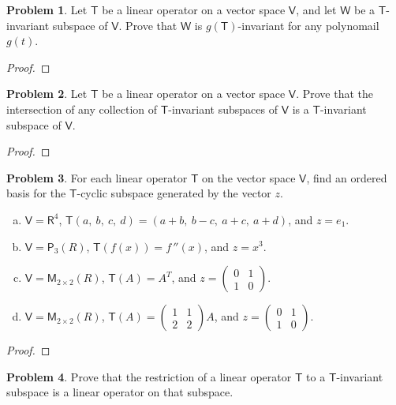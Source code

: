 \documentclass[12pt]{book}
\theoremstyle{definition}
\newtheorem{problem}{Problem}
\begin{document}
	\newpage
	\begin{problem}
		Let $\mathsf{T}$ be a linear operator on a vector space $\mathsf{V}$, and let $\mathsf{W}$ be a $\mathsf{T}$-invariant subspace of $\mathsf{V}$. Prove that $\mathsf{W}$ is $g(\mathsf{T})$-invariant for any polynomail $g(t)$.
	\end{problem}
	\begin{proof}
	\end{proof}
	\newpage
	\begin{problem}
		Let $\mathsf{T}$ be a linear operator on a vector space $\mathsf{V}$. Prove that the intersection of any collection of $\mathsf{T}$-invariant subspaces of $\mathsf{V}$ is a $\mathsf{T}$-invariant subspace of $\mathsf{V}$.
	\end{problem}
	\begin{proof}
	\end{proof}
	\newpage
	\begin{problem}
		For each linear operator $\mathsf{T}$ on the vector space $\mathsf{V}$, find an ordered basis for the $\mathsf{T}$-cyclic subspace generated by the vector $z$.
		\begin{enumerate}[(a)]
			\item $\mathsf{V}=\mathsf{R}^4$, $\mathsf{T}(a,~b,~c,~d)=(a+b,~b-c,~a+c,~a+d)$, and $z=e_1$.
			\item $\mathsf{V}=\mathsf{P}_3(R)$, $\mathsf{T}(f(x))=f\,''(x)$, and $z=x^3$.
			\item $\mathsf{V}=\mathsf{M}_{2\times 2}(R)$, $\mathsf{T}(A)=A^T$, and $z=\begin{pmatrix}
				0&1\\1&0
			\end{pmatrix}$.
			\item $\mathsf{V}=\mathsf{M}_{2\times 2}(R)$, $\mathsf{T}(A)=\begin{pmatrix}
				1&1\\2&2
			\end{pmatrix}A$, and $z=\begin{pmatrix}
			0&1\\1&0
		\end{pmatrix}$.
		\end{enumerate}
	\end{problem}
	\begin{proof}
	\end{proof}
	\newpage
	\begin{problem}
		Prove that the restriction of a linear operator $\mathsf{T}$ to a $\mathsf{T}$-invariant subspace is a linear operator on that subspace.
	\end{problem}
\end{document}
